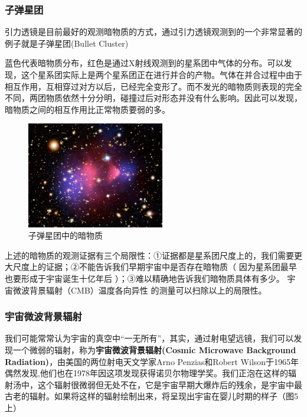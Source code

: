 \documentclass[UTF8]{ctexart}
\begin{document}
\subsubsection{子弹星团}
引力透镜是目前最好的观测暗物质的方式，通过引力透镜观测到的一个非常显著的例子就是子弹星团(Bullet Cluster)

蓝色代表暗物质分布，红色是通过X射线观测到的星系团中气体的分布。可以发现，这个星系团实际上是两个星系团正在进行并合的产物。气体在并合过程中由于相互作用，互相穿过对方以后，已经完全变形了。而不发光的暗物质则表现的完全不同，两团物质依然十分分明，碰撞过后对形态并没有什么影响。因此可以发现，暗物质之间的相互作用比正常物质要弱的多。
\begin{figure}[H]
    \centering
    \includegraphics[width=6cm]{8724e7ea8d9cd44483aa93287bae4158_1440w.jpg}
    \caption{子弹星团中的暗物质}
    \label{fig:my_label}
\end{figure}

上述的暗物质的观测证据有三个局限性：①证据都是星系团尺度上的，我们需要更大尺度上的证据；②不能告诉我们早期宇宙中是否存在暗物质（
因为星系团最早也要形成于宇宙诞生十亿年后
）；③难以精确地告诉我们暗物质具体有多少。
宇宙微波背景辐射（CMB）温度各向异性
的测量可以扫除以上的局限性。
\subsubsection{宇宙微波背景辐射}
我们可能常常认为宇宙的真空中“一无所有”，其实，通过射电望远镜，我们可以发现一个微弱的辐射，称为\textbf{宇宙微波背景辐射(Cosmic Microwave Background Radiation)}，由美国的两位射电天文学家Arno Penzias和Robert Wilson于1965年偶然发现,他们也在1978年因这项发现获得诺贝尔物理学奖。我们正泡在这样的辐射汤中，这个辐射很微弱但无处不在，它是宇宙早期大爆炸后的残余，是宇宙中最古老的辐射。如果将这样的辐射绘制出来，将呈现出宇宙在婴儿时期的样子（图5上）
\end{document}
